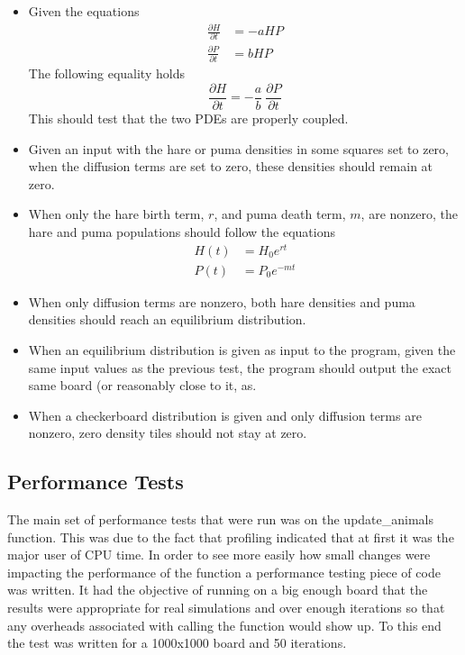 \begin{itemize}
  \item Given the equations
    \begin{align*}
      \frac{\partial{H}}{\partial{t}} &= -aHP \\
      \frac{\partial{P}}{\partial{t}} &=  bHP
    \end{align*}
    The following equality holds
    \begin{equation*}
      \frac{\partial{H}}{\partial{t}}
        = -\frac{a}{b}\ \frac{\partial{P}}{\partial{t}}
    \end{equation*}
    This should test that the two PDEs are properly coupled.

  \item Given an input with the hare or puma densities in some squares
        set to zero, when the diffusion terms are set to zero, these
        densities should remain at zero.

  \item When only the hare birth term, $r$, and puma death term, $m$, are
        nonzero, the hare and puma populations should follow the equations
        \begin{align*}
          H(t) &= H_0 e^{rt} \\
          P(t) &= P_0 e^{-mt}
        \end{align*}

  \item When only diffusion terms are nonzero, both hare densities and puma
        densities should reach an equilibrium distribution.

  \item When an equilibrium distribution is given as input to the program,
        given the same input values as the previous test, the program should
        output the exact same board (or reasonably close to it, as.

  \item When a checkerboard distribution is given and only diffusion terms
        are nonzero, zero density tiles should not stay at zero.
\end{itemize}


\subsection{Performance Tests}
The main set of performance tests that were run was on the update\_animals function.
This was due to the fact that profiling indicated that at first it was the major user of CPU time.
In order to see more easily how small changes were impacting the performance of the function a performance testing piece of code was written.
It had the objective of running on a big enough board that the results were appropriate for real simulations and over enough iterations so that any overheads associated with calling the function would show up.
To this end the test was written for a 1000x1000 board and 50 iterations.

